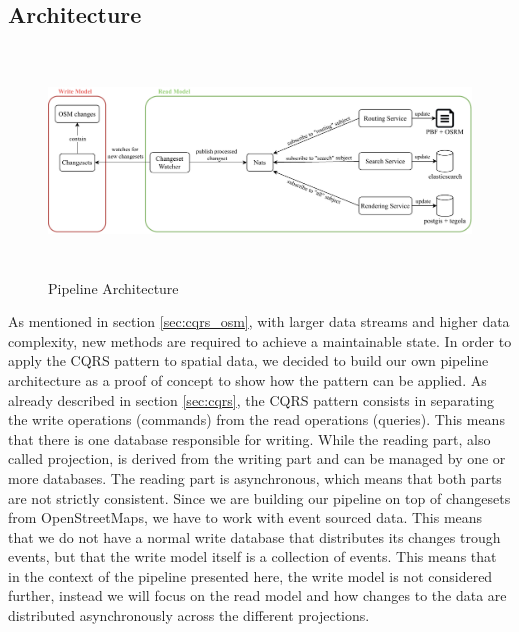 \documentclass[conference]{IEEEtran}
\begin{document}
\subsection{Architecture}
\label{subsec:Architecture}
\begin{figure}[h]
  \includegraphics[height=6cm]{figures/architecture.pdf}
  \centering
  \caption{Pipeline Architecture}
  \label{fig:architecture}
\end{figure}
As mentioned in section \ref{sec:cqrs_osm}, with larger data streams and higher data complexity, new methods are required to achieve a maintainable state. In order to apply the CQRS pattern to spatial data, we decided to build our own pipeline architecture as a proof of concept to show how the pattern can be applied.
As already described in section \ref{sec:cqrs}, the CQRS pattern consists in separating the write operations (commands) from the read operations (queries). This means that there is one database responsible for writing. While the reading part, also called projection, is derived from the writing part and can be managed by one or more databases. The reading part is asynchronous, which means that both parts are not strictly consistent. Since we are building our pipeline on top of changesets from OpenStreetMaps, we have to work with event sourced data. This means that we do not have a normal write database that distributes its changes trough events, but that the write model itself is a collection of events. This means that in the context of the pipeline presented here, the write model is not considered further, instead we will focus on the read model and how changes to the data are distributed asynchronously across the different projections. 
\end{document}
